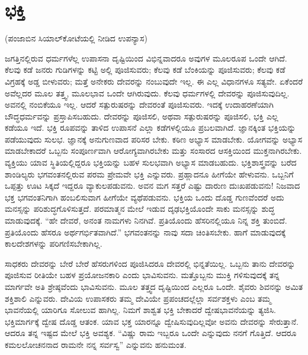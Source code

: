 
\chapter{ಭಕ್ತಿ}%

\begin{center}
(ಪಂಜಾಬಿನ ಸಿಯಾಲ್​ಕೋಟೆಯಲ್ಲಿ ನೀಡಿದ ಉಪನ್ಯಾಸ)
\end{center}

ಜಗತ್ತಿನಲ್ಲಿರುವ ಧರ್ಮಗಳೆಲ್ಲ ಉಪಾಸನಾ ದೃಷ್ಟಿಯಿಂದ ವಿಭಿನ್ನವಾದರೂ ಅವುಗಳ ಮೂಲರೂಪ ಒಂದೇ ಆಗಿದೆ. ಕೆಲವು ಕಡೆ ಜನರು ಗುಡಿಗಳನ್ನು ಕಟ್ಟಿ ಅಲ್ಲಿ ಪೂಜಿಸುವರು; ಕೆಲವು ಕಡೆ ಬೆಂಕಿಯನ್ನು ಪೂಜಿಸುವರು; ಕೆಲವು ಕಡೆ ವಿಗ್ರಹಕ್ಕೆ ಅಡ್ಡ ಬೀಳುವರು; ಮತ್ತೆ ಅನೇಕರು ದೇವರನ್ನು ನಂಬುವುದೇ ಇಲ್ಲ. ಈ ಎಲ್ಲ ವಿಧಾನಗಳೂ ಸತ್ಯವೇ. ಏಕೆಂದರೆ ಅವೆಲ್ಲದರ ಮೂಲ ತತ್ತ್ವ, ಮೂಲಭಾವ ಒಂದೇ ಆಗಿರುವುದು. ಕೆಲವು ಧರ್ಮಗಳಲ್ಲಿ ದೇವರನ್ನು ಪೂಜಿಸುವುದಿಲ್ಲ. ಅವನಲ್ಲಿ ನಂಬಿಕೆಯೂ ಇಲ್ಲ. ಆದರೆ ಸತ್ಪುರುಷರನ್ನು ದೇವರಂತೆ ಪೂಜಿಸುವರು. ಇದಕ್ಕೆ ಉದಾಹರಣೆಯಾಗಿ ಬೌದ್ಧಧರ್ಮವನ್ನು ಪ್ರಸ್ತಾಪಿಸಬಹುದು. ದೇವರನ್ನು ಪೂಜಿಸಲಿ, ಅಥವಾ ಸತ್ಪುರುಷರನ್ನು ಪೂಜಿಸಲಿ, ಭಕ್ತಿ ಎಲ್ಲ ಕಡೆಯೂ ಇದೆ. ಭಕ್ತಿ ರೂಪವನ್ನು ತಾಳಿದ ಉಪಾಸನೆ ಎಲ್ಲಾ ಕಡೆಗಳಲ್ಲಿಯೂ ಪ್ರಬಲವಾಗಿದೆ. ಜ್ಞಾನಕ್ಕಿಂತ ಭಕ್ತಿಯನ್ನು ಪಡೆಯುವುದು ಸುಲಭ. ಜ್ಞಾನಕ್ಕೆ ಅನುಗುಣವಾದ ಪರಿಸರ ಬೇಕು. ಕಠಿಣ ಅಭ್ಯಾಸ ಮಾಡಬೇಕು. ಯೋಗವನ್ನು ಅಭ್ಯಾಸ ಮಾಡಬೇಕಾದರೆ ಒಬ್ಬನು ಸಂಪೂರ್ಣವಾಗಿ ಆರೋಗ್ಯವಾಗಿರಬೇಕು ಮತ್ತು ಸಂಸಾರದ ಆಸಕ್ತಿಯಿಂದ ಮುಕ್ತನಾಗಿರಬೇಕು. ವ್ಯಕ್ತಿಯು ಯಾವ ಸ್ಥಿತಿಯಲ್ಲಿದ್ದರೂ ಭಕ್ತಿಯನ್ನು ಬಹಳ ಸುಲಭವಾಗಿ ಅಭ್ಯಾಸ ಮಾಡಬಹುದು. ಭಕ್ತಿಶಾಸ್ತ್ರವನ್ನು ಬರೆದ ಶಾಂಡಿಲ್ಯರು ಭಗವಂತನಲ್ಲಿರುವ ಪರಮ ಪ್ರೇಮವೇ ಭಕ್ತಿ ಎನ್ನುವರು. ಪ್ರಹ್ಲಾದನೂ ಹೀಗೆಯೇ ಹೇಳುವನು. ಒಬ್ಬನಿಗೆ ಒಪ್ಪತ್ತು ಊಟ ಸಿಕ್ಕದೆ ಇದ್ದರೂ ವ್ಯಾಕುಲಪಡುವನು. ಅವನ ಮಗ ಸತ್ತರೆ ಎಷ್ಟು ದಾರುಣ ದುಃಖಪಡುವನು! ನಿಜವಾದ ಭಕ್ತ ಭಗವಂತನಿಗಾಗಿ ಹಂಬಲಿಸುವಾಗ ಹೀಗೆಯೇ ವ್ಯಥೆಪಡುವನು. ಭಕ್ತಿಯ ಒಂದು ದೊಡ್ಡ ಗುಣವೆಂದರೆ ಅದು ಮನಸ್ಸನ್ನು ಪರಿಶುದ್ಧಗೊಳಿಸುತ್ತದೆ. ಪರಮಾತ್ಮನ ಮೇಲೆ ಇಡುವ ದೃಢಭಕ್ತಿಯೊಂದೇ ಸಾಕು ಮನಸ್ಸನ್ನು ಶುದ್ಧ ಮಾಡುವುದಕ್ಕೆ. “ಹೇ ದೇವರೆ, ಅನಂತ ನಾಮಗಳು ನಿನಗಿವೆ. ಪ್ರತಿಯೊಂದು ಹೆಸರಿನಲ್ಲಿಯೂ ನಿನ್ನ ಶಕ್ತಿ ತುಂಬಿದೆ. ಪ್ರತಿಯೊಂದು ಹೆಸರೂ ಅರ್ಥಗರ್ಭಿತವಾಗಿದೆ.” ಭಗವಂತನನ್ನು ನಾವು ಸದಾ ಚಿಂತಿಸಬೇಕು. ಹಾಗೆ ಮಾಡುವುದಕ್ಕೆ ಕಾಲದೇಶಗಳನ್ನು ಪರಿಗಣಿಸಬೇಕಾಗಿಲ್ಲ.

\vskip 0.2cm

ಸಾಧಕರು ದೇವರನ್ನು ಬೇರೆ ಬೇರೆ ಹೆಸರುಗಳಿಂದ ಪೂಜಿಸಿದರೂ ದೇವರಲ್ಲಿ ಭಿನ್ನತೆಯಿಲ್ಲ. ಒಬ್ಬನು ತಾನು ದೇವರನ್ನು ಪೂಜಿಸುವ ರೀತಿಯೇ ಬಹಳ ಪ್ರಯೋಜನಕಾರಿ ಎಂದು ಭಾವಿಸುವನು. ಮತ್ತೊಬ್ಬನು ಮುಕ್ತಿ ಗಳಿಸುವುದಕ್ಕೆ ತನ್ನ ಮಾರ್ಗವೇ ಅತಿ ಶ್ರೇಷ್ಠವೆಂದು ಭಾವಿಸುವನು. ಮೂಲ ತತ್ತ್ವದ ದೃಷ್ಟಿಯಿಂದ ಎಲ್ಲರೂ ಒಂದೇ. ಶೈವರು ಶಿವನನ್ನು ಅಮಿತ ಶಕ್ತಿಶಾಲಿ ಎನ್ನುವರು. ದೇವಿಯ ಉಪಾಸಕರು ತಮ್ಮ ದೇವಿಯೇ ಪ್ರಪಂಚದಲ್ಲೆಲ್ಲಾ ಸರ್ವಶಕ್ತಳು ಎಂಬ ತಮ್ಮ ಭಾವನೆಯಲ್ಲಿ ಯಾರಿಗೂ ಸೋಲುವ ಹಾಗಿಲ್ಲ. ನಿಮಗೆ ಶಾಶ್ವತ ಭಕ್ತಿ ಬೇಕಾದರೆ ದ್ವೇಷಭಾವನೆಯನ್ನು ತ್ಯಜಿಸಿ. ಭಕ್ತಿಮಾರ್ಗಕ್ಕೆ ದ್ವೇಷ ದೊಡ್ಡ ಆತಂಕ. ಯಾವ ಭಕ್ತ ಯಾರನ್ನೂ ದ್ವೇಷಿಸುವುದಿಲ್ಲವೋ ಅವನು ದೇವರನ್ನು ಸೇರುತ್ತಾನೆ. ಆದರೂ ತನ್ನ ಇಷ್ಟದ ಮೇಲೆ ಭಕ್ತಿ ಅವಶ್ಯಕ. “ವಿಷ್ಣು ರಾಮ ಇಬ್ಬರೂ ಒಂದೇ ಎನ್ನುವುದು ನನಗೆ ಗೊತ್ತಿದೆ. ಆದರೂ ಕಮಲಲೋಚನನಾದ ರಾಮನೇ ನನ್ನ ಸರ್ವಸ್ವ” ಎನ್ನುವನು ಹನುಮಂತ.

